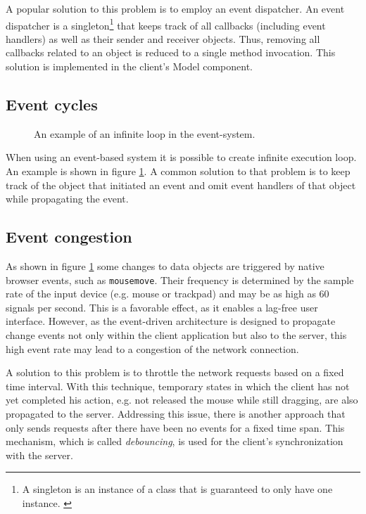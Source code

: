 A popular solution to this problem is to employ an event dispatcher. An event dispatcher is a singleton\footnote{A singleton is an instance of a class that is guaranteed to only have one instance. \cite{Gamma_1994}} that keeps track of all callbacks (including event handlers) as well as their sender and receiver objects. Thus, removing all callbacks related to an object is reduced to a single method invocation. This solution is implemented in the client's Model component.


\subsection{Event cycles}

\begin{figure}
\begin{center}
\caption{An example of an infinite loop in the event-system.}
\label{fig:eventcycle}
\end{center}
\end{figure}

When using an event-based system it is possible to create infinite execution loop. An example is shown in figure \ref{fig:eventcycle}. A common solution to that problem is to keep track of the object that initiated an event and omit event handlers of that object while propagating the event. 

\subsection{Event congestion}
As shown in figure \ref{fig:eventcycle} some changes to data objects are triggered by native browser events, such as \texttt{mousemove}. Their frequency is determined by the sample rate of the input device (e.g. mouse or trackpad) and may be as high as 60 signals per second. This is a favorable effect, as it enables a lag-free user interface. However, as the event-driven architecture is designed to propagate change events not only within the client application but also to the server, this high event rate may lead to a congestion of the network connection. 

A solution to this problem is to throttle the network requests based on a fixed time interval. With this technique, temporary states in which the client has not yet completed his action, e.g. not released the mouse while still dragging, are also propagated to the server. Addressing this issue, there is another approach that only sends requests after there have been no events for a fixed time span. This mechanism, which is called \textit{debouncing}, is used for the client's synchronization with the server. 


